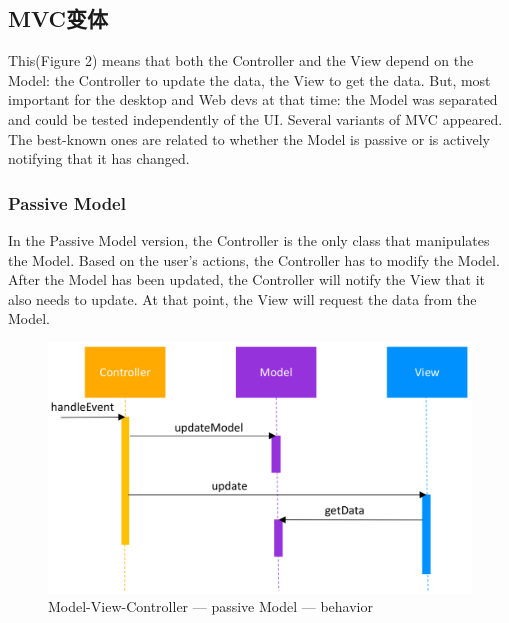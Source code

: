 \documentclass[a4paper,12pt]{ctexart}
\begin{document}
	\subsection{MVC变体}
	This(Figure 2) means that both the Controller and the View depend on the Model: the Controller to update the data, the View to get the data. But, most important for the desktop and Web devs at that time: the Model was separated and could be tested independently of the UI. Several variants of MVC appeared. The best-known ones are related to whether the Model is passive or is actively notifying that it has changed.
	\subsubsection{Passive Model}
	In the Passive Model version, the Controller is the only class that manipulates the Model. Based on the user’s actions, the Controller has to modify the Model. After the Model has been updated, the Controller will notify the View that it also needs to update. At that point, the View will request the data from the Model.
	\begin{figure}[ht]
		\centering
		\includegraphics[width=\textwidth]{image/3.png}
		\caption{Model-View-Controller — passive Model — behavior}
	\end{figure}
\end{document}
